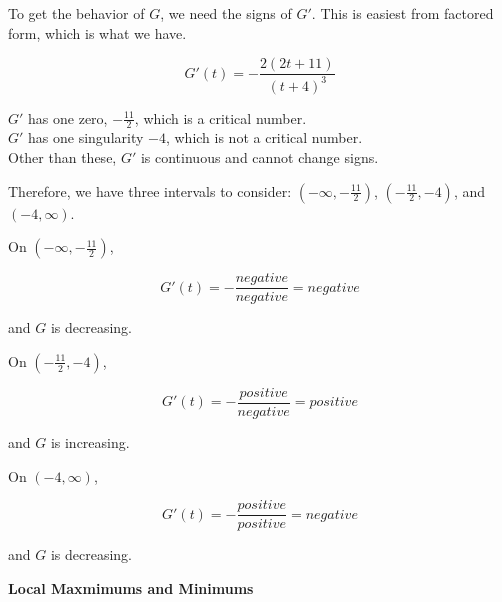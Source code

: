 \documentclass{ximera}
\begin{document}
\begin{explanation}

To get the behavior of $G$, we need the signs of $G'$.  This is easiest from factored form, which is what we have.


\[
G'(t) = -\frac{2(2t+11)}{(t+4)^3}
\]


$G'$ has one zero, $-\frac{11}{2}$, which is a critical number. \\


$G'$ has one singularity $-4$, which is not a critical number. \\



Other than these, $G'$ is continuous and cannot change signs.


Therefore, we have three intervals to consider:  $\left( -\infty, -\frac{11}{2} \right)$, $\left( -\frac{11}{2}, -4 \right)$, and $(-4, \infty)$.



On $\left( -\infty, -\frac{11}{2} \right)$, 

\[

G'(t) = -\frac{negative}{negative} = negative
\]


and $G$ is decreasing.






On $\left( -\frac{11}{2}, -4 \right)$, 

\[

G'(t) = -\frac{positive}{negative} = positive
\]


and $G$ is increasing.







On $(-4, \infty)$, 

\[

G'(t) = -\frac{positive}{positive} = negative
\]


and $G$ is decreasing.





\end{explanation}
















\textbf{\textcolor{purple!85!blue}{Local Maxmimums and Minimums}} \\
\end{document}
